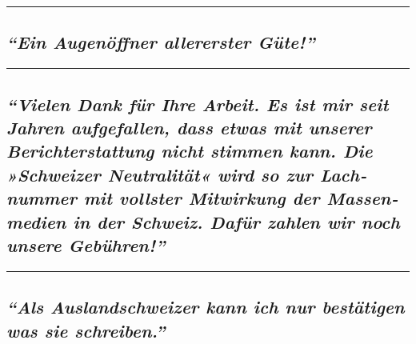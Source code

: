 \begin{center}\rule{0.5\linewidth}{\linethickness}\end{center}

\hypertarget{ein-augenuxf6ffner-allererster-guxfcte}{%
\subsection{\texorpdfstring{\emph{``Ein Augenöffner allererster
Güte!''}}{``Ein Augenöffner allererster Güte!''}}\label{ein-augenuxf6ffner-allererster-guxfcte}}

\begin{center}\rule{0.5\linewidth}{\linethickness}\end{center}

\hypertarget{vielen-dank-fuxfcr-ihre-arbeit-es-ist-mir-seit-jahren-aufgefallen-dass-etwas-mit-unserer-berichterstattung-nicht-stimmen-kann-die-schweizer-neutralituxe4t-wird-so-zur-lachnummer-mit-vollster-mitwirkung-der-massenmedien-in-der-schweiz-dafuxfcr-zahlen-wir-noch-unsere-gebuxfchren}{%
\subsection{\texorpdfstring{\emph{``Vielen Dank für Ihre Arbeit. Es ist
mir seit Jahren auf­ge­fallen, dass etwas mit unserer
Bericht­er­stattung nicht stimmen kann. Die »Schweizer Neutralität« wird
so zur Lach­nummer mit vollster Mit­wirkung der Massen­medien in der
Schweiz. Dafür zahlen wir noch unsere
Gebühren!''}}{``Vielen Dank für Ihre Arbeit. Es ist mir seit Jahren auf­ge­fallen, dass etwas mit unserer Bericht­er­stattung nicht stimmen kann. Die »Schweizer Neutralität« wird so zur Lach­nummer mit vollster Mit­wirkung der Massen­medien in der Schweiz. Dafür zahlen wir noch unsere Gebühren!''}}\label{vielen-dank-fuxfcr-ihre-arbeit-es-ist-mir-seit-jahren-aufgefallen-dass-etwas-mit-unserer-berichterstattung-nicht-stimmen-kann-die-schweizer-neutralituxe4t-wird-so-zur-lachnummer-mit-vollster-mitwirkung-der-massenmedien-in-der-schweiz-dafuxfcr-zahlen-wir-noch-unsere-gebuxfchren}}

\begin{center}\rule{0.5\linewidth}{\linethickness}\end{center}

\hypertarget{als-auslandschweizer-kann-ich-nur-bestuxe4tigen-was-sie-schreiben}{%
\subsection{\texorpdfstring{\emph{``Als Auslandschweizer kann ich nur
bestätigen was sie
schreiben.''}}{``Als Auslandschweizer kann ich nur bestätigen was sie schreiben.''}}\label{als-auslandschweizer-kann-ich-nur-bestuxe4tigen-was-sie-schreiben}}

